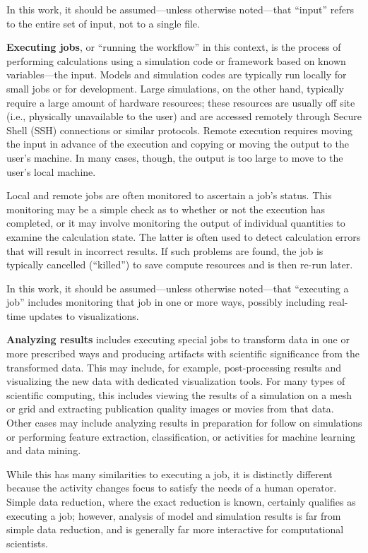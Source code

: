 In this work, it should be assumed---unless otherwise noted---that
``input'' refers to the entire set of input, not to a single file.

\textbf{Executing jobs}, or ``running the workflow'' in this context, is
the process of performing calculations using a simulation code or
framework based on known variables---the input. Models and simulation
codes are typically run locally for small jobs or for development. Large
simulations, on the other hand, typically require a large amount of
hardware resources; these resources are usually off site (i.e.,
physically unavailable to the user) and are accessed remotely
through Secure Shell (SSH) connections or similar protocols. Remote
execution requires moving the input in advance of the execution and
copying or moving the output to the user's machine. In many cases,
though, the output is too large to move to the user's local machine.

Local and remote jobs are often monitored to ascertain a job's status.
This monitoring may be a simple check as to whether or not the execution
has completed, or it may involve monitoring the output of individual
quantities to examine the calculation state. The latter is often used to
detect calculation errors that will result in incorrect results. If such
problems are found, the job is typically cancelled (``killed'') to save
compute resources and is then re-run later.

In this work, it should be assumed---unless otherwise noted---that
``executing a job'' includes monitoring that job in one or more ways,
possibly including real-time updates to visualizations.

\textbf{Analyzing results} includes executing special jobs to transform
data in one or more prescribed ways and producing artifacts with
scientific significance from the transformed data. This may include, for
example, post-processing results and visualizing the new data with
dedicated visualization tools. For many types of scientific computing,
this includes viewing the results of a simulation on a mesh or grid and
extracting publication quality images or movies from that data. Other
cases may include analyzing results in preparation for follow on
simulations or performing feature extraction, classification, or
activities for machine learning and data mining.

While this has many similarities to executing a job, it is distinctly
different because the activity changes focus to satisfy the needs of a
human operator. Simple data reduction, where the exact reduction is
known, certainly qualifies as executing a job; however, analysis of
model and simulation results is far from simple data reduction, and is
generally far more interactive for computational scientists.

